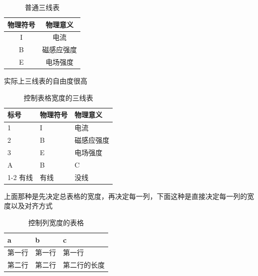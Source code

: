 \documentclass[draft,14pt]{extarticle}%
\begin{document}
\begin{table}[H]
    \centering
    \begin{tabular}{cc}
    \toprule%
    \qquad 物理符号 \qquad\qquad &\qquad 物理意义 \qquad\qquad\\%
    \midrule
    I&电流\\
    B&磁感应强度\\
    E&电场强度\\ 
    \bottomrule
    \end{tabular}
    \caption{普通三线表}
    \label{d}
\end{table}
\vspace{+25pt}
实际上三线表的自由度很高
\begin{table}[H]
    \centering
    \begin{tabularx}{0.8\textwidth}{Xl>{\centering\arraybackslash}X}%
    \toprule
    \midrule %
    标号&物理符号&物理意义 \\%
    \midrule
    1&I&电流\\
    2&B&磁感应强度\\
    3&E&电场强度\\ 
    \midrule%
    A&B&C\\
    \cmidrule{1-2}%
    有线&有线&没线\\
    \midrule
    \bottomrule
    \end{tabularx}
    \caption*{控制表格宽度的三线表} %
\end{table}
上面那种是先决定总表格的宽度，再决定每一列，下面这种是直接决定每一列的宽度以及对齐方式
\begin{table}[H]
    \centering
    \caption{控制列宽度的表格}%
    \begin{tabular}{>{\centering\arraybackslash}p{3cm}|>{\centering\arraybackslash}p{4cm}|>{\centering\arraybackslash}p{5cm}}%
    a & b & c \\
    \hline%
    第一行 & 第一行 & 第一行 \\
    第二行 & 第二行 & 第二行的长度 \\
    \end{tabular}
\end{table}
\end{document}
